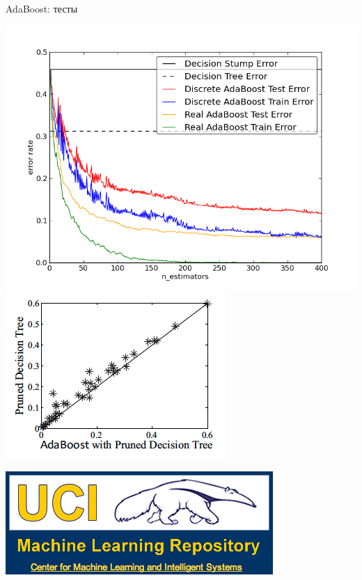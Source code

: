\documentclass[10pt,a4paper]{beamer}
\begin{document}
\begin{frame}{AdaBoost: тесты}

\begin{center}
\includegraphics[scale=0.25]{images/ada.png}\;
\includegraphics[scale=0.42]{images/ada2.png}

\hspace{17em}\includegraphics[scale=0.2]{images/uci.png}
\end{center}

\end{frame}

\end{document}

